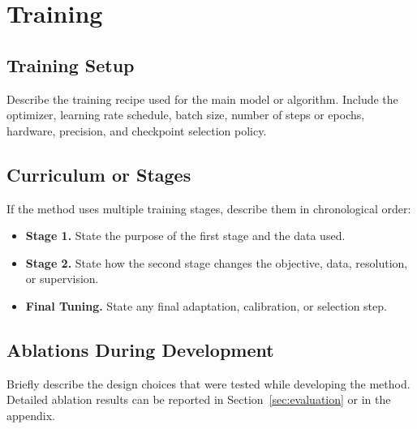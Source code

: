 \section{Training}

\subsection{Training Setup}

Describe the training recipe used for the main model or algorithm.
Include the optimizer, learning rate schedule, batch size, number of steps or epochs, hardware, precision, and checkpoint selection policy.

\subsection{Curriculum or Stages}

If the method uses multiple training stages, describe them in chronological order:
\begin{itemize}
    \item \textbf{Stage 1.} State the purpose of the first stage and the data used.
    \item \textbf{Stage 2.} State how the second stage changes the objective, data, resolution, or supervision.
    \item \textbf{Final Tuning.} State any final adaptation, calibration, or selection step.
\end{itemize}

\subsection{Ablations During Development}

Briefly describe the design choices that were tested while developing the method.
Detailed ablation results can be reported in Section~\ref{sec:evaluation} or in the appendix.
